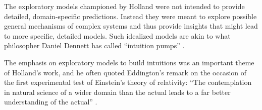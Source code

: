 \documentclass{sig-alternate}
\begin{document}

The exploratory models championed by Holland were not intended to
provide detailed, domain-specific predictions.  Instead they were
meant to explore possible general mechanisms of complex systems and
thus provide insights that might lead to more specific, detailed
models.  Such idealized models are akin to what philosopher Daniel Dennett has called
``intuition pumps'' \cite{Dennett1984}.

The emphasis on exploratory models to build intuitions was an
important theme of Holland's work, and he often quoted Eddington's
remark on the occasion of the first experimental test of Einstein's
theory of relativity: ``The contemplation in natural science of a wider
domain than the actual leads to a far better understanding of the
actual'' \cite{Eddington1927}.




\end{document}
